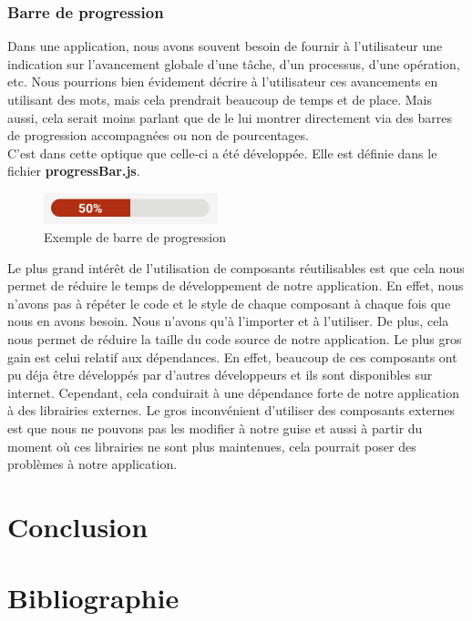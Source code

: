 \documentclass[12pt]{article}
\begin{document}

        \subsubsection{Barre de progression}\label{subsubsec:barre-de-progression}
        Dans une application, nous avons souvent besoin de fournir à l'utilisateur une indication sur l'avancement globale
        d'une tâche, d'un processus, d'une opération, etc. Nous pourrions bien évidement décrire à l'utilisateur ces
        avancements en utilisant des mots, mais cela prendrait beaucoup de temps et de place. Mais aussi, cela serait moins
        parlant que de le lui montrer directement via des barres de progression accompagnées ou non de pourcentages.\\
        C'est dans cette optique que celle-ci a été développée. Elle est définie dans le fichier \textbf{progressBar.js}.
        \begin{figure}[H]
            \centering
            \includegraphics[width=0.45\textwidth]{images/progress-bar}
            \caption{Exemple de barre de progression}
            \label{fig:progress-bar}
        \end{figure}


        Le plus grand intérêt de l'utilisation de composants réutilisables est que cela nous permet de réduire le temps de développement
        de notre application. En effet, nous n'avons pas à répéter le code et le style de chaque composant à chaque fois que nous en avons besoin.
        Nous n'avons qu'à l'importer et à l'utiliser. De plus, cela nous permet de réduire la taille du code source de notre application. Le plus
        gros gain est celui relatif aux dépendances. En effet, beaucoup de ces composants ont pu déja être développés par d'autres
        développeurs et ils sont disponibles sur internet. Cependant, cela conduirait à une dépendance forte de notre application à des librairies
        externes. Le gros inconvénient d'utiliser des composants externes est que nous ne pouvons pas les modifier à notre guise et
        aussi à partir du moment où ces librairies ne sont plus maintenues, cela pourrait poser des problèmes à notre application.

        \section{Conclusion}\label{sec:conclusion}

        \section{Bibliographie}\label{sec:bibliographie}

        
\end{document}
